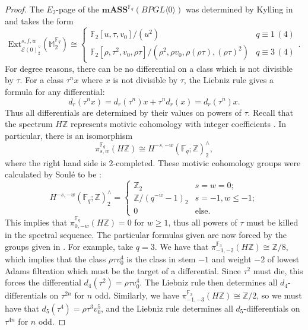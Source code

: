 \documentclass{amsart}
\theoremstyle{plain}
\numberwithin{theorem}{section}
\numberwithin{equation}{section}
\numberwithin{figure}{section}
\newcommand{\0}{\langle 0 \rangle }
\begin{document}
\begin{proof}
    The $E_2$-page of the $\textbf{mASS}^{\mathbb{F}_q}(BPGL \langle 0 \rangle)$ was determined by Kylling in \cite[Theorem 4.1.2, Theorem 4.1.3]{Kylingkqfinite} and takes the form
    \[\text{Ext}^{s,f,w}_{\mathcal{E}(0)^\vee_2}(\mathbb{M}_2^{\mathbb{F}_q}) \cong \left\{ \begin{array}{lc}
    \mathbb{F}_2[u, \tau, v_0]/(u^2) & q \equiv 1 \, (4) \\
    \mathbb{F}_2[\rho, \tau^2, v_0, \rho\tau]/(\rho^2, \rho v_0, \rho(\rho\tau), (\rho\tau)^2) & q \equiv 3 \, (4)
    \end{array}\right..\]
    For degree reasons, there can be no differential on a class which is not divisible by $\tau$. For a class $\tau^nx$ where $x$ is not divisible by $\tau$, the Liebniz rule gives a formula for any differential:
    \[d_r(\tau^nx) = d_r(\tau^n)x + \tau^nd_r(x) = d_r(\tau^n)x.\]
    Thus all differentials are determined by their values on powers of $\tau$. 
    Recall that the spectrum $H\mathbb{Z}$ represents motivic cohomology with integer coefficients \cite{Spitzweck18}. In particular, there is an isomorphism
    \[\pi_{s,w}^{\mathbb{F}_q}(H\mathbb{Z}) \cong H^{-s,-w}(\mathbb{F}_q; \mathbb{Z})_2^\wedge, \]
    where the right hand side is 2-completed.
    These motivic cohomology groups were calculated by Soul\'e to be \cite{Soule79}:
    \begin{equation}
    \label{eq:FinitefieldMotivicCohomology2Complete}
    H^{-s,-w}(\mathbb{F}_q;\mathbb{Z})_2^\wedge = \left\{\begin{array}{rl}
    \mathbb{Z}_2 & s=w=0; \\
    \mathbb{Z}/(q^{-w}-1)_2 & s=-1, w \leq -1;\\
    0 & \text{else}.
    \end{array}\right.
    \end{equation}    
    This implies that $\pi_{0, -w}^{\mathbb{F}_q}(H\mathbb{Z}) = 0$ for $w \geq 1$, thus all powers of $\tau$ must be killed in the spectral sequence. The particular formulas given are now forced by the groups given in . For example, take $q=3$. We have that $\pi_{-1, -2}^{\mathbb{F}_3}(H\mathbb{Z}) \cong \mathbb{Z}/8$, which implies that the class $\rho \tau v_0^4$ is the class in stem $-1$ and weight $-2$ of lowest Adams filtration which must be the target of a differential. Since $\tau^2$ must die, this forces the differential $d_{4}(\tau^2) = \rho \tau v_0^4$. The Liebniz rule then determines all $d_4$-differentials on $\tau^{2n}$ for $n$ odd. Similarly, we have $\pi_{-1, -3}^{\mathbb{F}_3}(H\mathbb{Z}) \cong \mathbb{Z}/2$, so we must have that $d_{5}(\tau^4) = \rho\tau^3v_0^5$, and the Liebniz rule determines all $d_5$-differentials on $\tau^{4n}$ for $n$ odd.
\end{proof}
\end{document}

